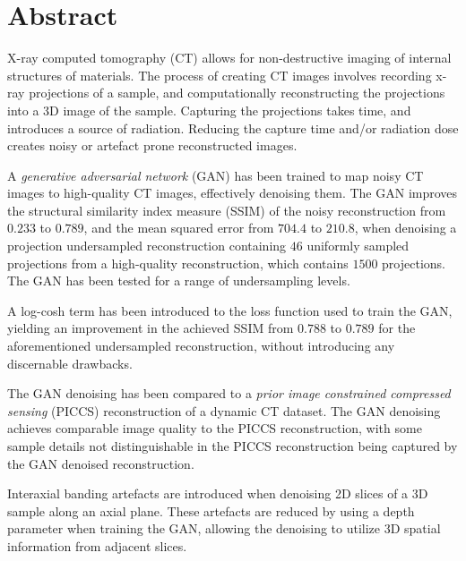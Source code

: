 \chapter*{Abstract}
X-ray computed tomography (CT) allows for non-destructive imaging of internal structures of materials. The process of creating CT images involves recording x-ray projections of a sample, and computationally reconstructing the projections into a 3D image of the sample. Capturing the projections takes time, and introduces a source of radiation. Reducing the capture time and/or radiation dose creates noisy or artefact prone reconstructed images. 

A \textit{generative adversarial network} (GAN) has been trained to map noisy CT images to high-quality CT images, effectively denoising them. The GAN improves the structural similarity index measure (SSIM) of the noisy reconstruction from $0.233$ to $0.789$, and the mean squared error from $704.4$ to $210.8$, when denoising a projection undersampled reconstruction containing $46$ uniformly sampled projections from a high-quality reconstruction, which contains $1500$ projections. The GAN has been tested for a range of undersampling levels. 

A log-cosh term has been introduced to the loss function used to train the GAN, yielding an improvement in the achieved SSIM from $0.788$ to $0.789$ for the aforementioned undersampled reconstruction, without introducing any discernable drawbacks. 

The GAN denoising has been compared to a \textit{prior image constrained compressed sensing} (PICCS) reconstruction of a dynamic CT dataset. The GAN denoising achieves comparable image quality to the PICCS reconstruction, with some sample details not distinguishable in the PICCS reconstruction being captured by the GAN denoised reconstruction. 

Interaxial banding artefacts are introduced when denoising 2D slices of a 3D sample along an axial plane. These artefacts are reduced by using a depth parameter when training the GAN, allowing the denoising to utilize 3D spatial information from adjacent slices. 